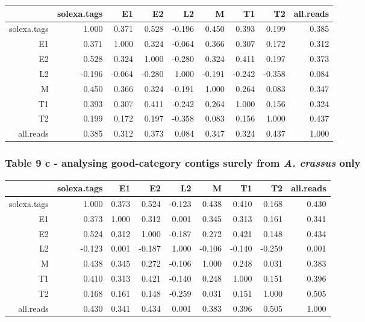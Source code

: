 \documentclass[10pt]{bmc_article}
\newenvironment{bmcformat}{\begin{raggedright}\baselineskip20pt\sloppy\setboolean{publ}{false}}{\end{raggedright}\baselineskip20pt\sloppy}
\begin{document}
\begin{bmcformat}
\begin{tabular}{rrrrrrrrr}
  \hline
 & solexa.tags & E1 & E2 & L2 & M & T1 & T2 & all.reads \\ 
  \hline
solexa.tags & 1.000 & 0.371 & 0.528 & -0.196 & 0.450 & 0.393 & 0.199 & 0.385 \\ 
  E1 & 0.371 & 1.000 & 0.324 & -0.064 & 0.366 & 0.307 & 0.172 & 0.312 \\ 
  E2 & 0.528 & 0.324 & 1.000 & -0.280 & 0.324 & 0.411 & 0.197 & 0.373 \\ 
  L2 & -0.196 & -0.064 & -0.280 & 1.000 & -0.191 & -0.242 & -0.358 & 0.084 \\ 
  M & 0.450 & 0.366 & 0.324 & -0.191 & 1.000 & 0.264 & 0.083 & 0.347 \\ 
  T1 & 0.393 & 0.307 & 0.411 & -0.242 & 0.264 & 1.000 & 0.156 & 0.324 \\ 
  T2 & 0.199 & 0.172 & 0.197 & -0.358 & 0.083 & 0.156 & 1.000 & 0.437 \\ 
  all.reads & 0.385 & 0.312 & 0.373 & 0.084 & 0.347 & 0.324 & 0.437 & 1.000 \\ 
   \hline
\end{tabular}
\subsubsection*{Table 9 c - analysing good-category contigs surely from \textit{A. crassus} only}

\begin{tabular}{rrrrrrrrr}
  \hline
 & solexa.tags & E1 & E2 & L2 & M & T1 & T2 & all.reads \\ 
  \hline
solexa.tags & 1.000 & 0.373 & 0.524 & -0.123 & 0.438 & 0.410 & 0.168 & 0.430 \\ 
  E1 & 0.373 & 1.000 & 0.312 & 0.001 & 0.345 & 0.313 & 0.161 & 0.341 \\ 
  E2 & 0.524 & 0.312 & 1.000 & -0.187 & 0.272 & 0.421 & 0.148 & 0.434 \\ 
  L2 & -0.123 & 0.001 & -0.187 & 1.000 & -0.106 & -0.140 & -0.259 & 0.001 \\ 
  M & 0.438 & 0.345 & 0.272 & -0.106 & 1.000 & 0.248 & 0.031 & 0.383 \\ 
  T1 & 0.410 & 0.313 & 0.421 & -0.140 & 0.248 & 1.000 & 0.151 & 0.396 \\ 
  T2 & 0.168 & 0.161 & 0.148 & -0.259 & 0.031 & 0.151 & 1.000 & 0.505 \\ 
  all.reads & 0.430 & 0.341 & 0.434 & 0.001 & 0.383 & 0.396 & 0.505 & 1.000 \\ 
   \hline
\end{tabular}


\end{bmcformat}
\end{document}
